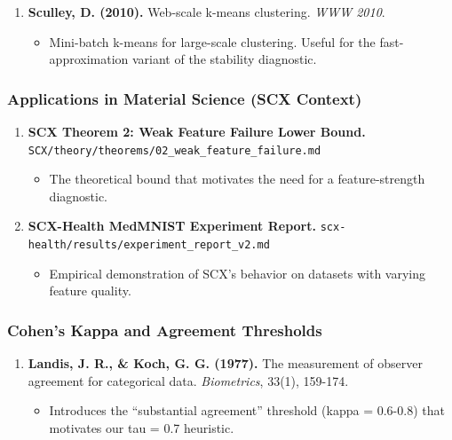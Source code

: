 \documentclass[
  12pt,
]{article}
\providecommand{\tightlist}{%
  \setlength{\itemsep}{0pt}\setlength{\parskip}{0pt}}
\begin{document}
\begin{enumerate}
\def\labelenumi{\arabic{enumi}.}
\setcounter{enumi}{7}
\tightlist
\item
  \textbf{Sculley, D. (2010).} Web-scale k-means clustering. \emph{WWW
  2010}.

  \begin{itemize}
  \tightlist
  \item
    Mini-batch k-means for large-scale clustering. Useful for the
    fast-approximation variant of the stability diagnostic.
  \end{itemize}
\end{enumerate}

\subsubsection{Applications in Material Science (SCX
Context)}\label{applications-in-material-science-scx-context}

\begin{enumerate}
\def\labelenumi{\arabic{enumi}.}
\setcounter{enumi}{8}
\tightlist
\item
  \textbf{SCX Theorem 2: Weak Feature Failure Lower Bound.}
  \texttt{SCX/theory/theorems/02\_weak\_feature\_failure.md}

  \begin{itemize}
  \tightlist
  \item
    The theoretical bound that motivates the need for a feature-strength
    diagnostic.
  \end{itemize}
\item
  \textbf{SCX-Health MedMNIST Experiment Report.}
  \texttt{scx-health/results/experiment\_report\_v2.md}

  \begin{itemize}
  \tightlist
  \item
    Empirical demonstration of SCX's behavior on datasets with varying
    feature quality.
  \end{itemize}
\end{enumerate}

\subsubsection{Cohen's Kappa and Agreement
Thresholds}\label{cohens-kappa-and-agreement-thresholds}

\begin{enumerate}
\def\labelenumi{\arabic{enumi}.}
\setcounter{enumi}{10}
\tightlist
\item
  \textbf{Landis, J. R., \& Koch, G. G. (1977).} The measurement of
  observer agreement for categorical data. \emph{Biometrics}, 33(1),
  159-174.

  \begin{itemize}
  \tightlist
  \item
    Introduces the ``substantial agreement'' threshold (kappa = 0.6-0.8)
    that motivates our tau = 0.7 heuristic.
  \end{itemize}
\end{enumerate}
\end{document}
